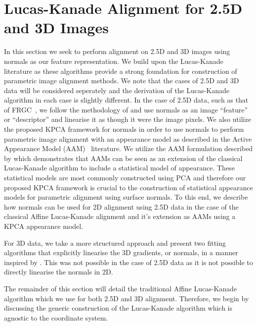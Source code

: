 \section{Lucas-Kanade Alignment for 2.5D and 3D Images}\label{sec:singl_imag_lk}
In this section we seek to perform alignment on 2.5D and 3D images using
normals as our feature representation. We build upon the 
Lucas-Kanade~\cite{lucas1981iterative} literature as these algorithms provide
a strong foundation for construction of parametric image alignment methods. We note that
the cases of 2.5D and 3D data will be considered seperately and the derivation
of the Lucas-Kanade algorithm in each case is slightly different. In the
case of 2.5D data, such as that of FRGC~\cite{phillips2005overview}, we follow
the methodology of \citet{antonakos2015feature} and use normals as an image
``feature'' or ``descriptor'' and linearise it as though it were the image pixels.
We also utilize the proposed KPCA framework for normals in order to use normals
to perform parametric image alignment with an appearance model as described
in the Active Appearance Model (AAM)~\cite{cootes2001active} literature. We
utilize the AAM formulation described by \citet{matthews2004active} which
demonstrates that AAMs can be seen as an extension of the classical Lucas-Kanade
algorithm to include a statistical model of appearance. These statistical models
are most commonly constructed using PCA and therefore our proposed KPCA
framework is crucial to the construction of statistical appearance models for
parametric alignment using surface normals. To this end, we describe how
normals can be used for 2D alignment using 2.5D data in the case of the
classical Affine Lucas-Kanade alignment and it's extension as AAMs using a 
KPCA appearance model.

For 3D data, we take a more structured approach and present two fitting algorithms
that explicitly linearise the 3D gradients, or normals, in a manner inspired
by \citet{tzimiropoulos2011robust}. This was not possible in the case of 2.5D
data as it is not possible to directly linearise the normals in 2D.

The remainder of this section will detail the traditional Affine Lucas-Kanade
algorithm which we use for both 2.5D and 3D alignment. Therefore, we begin by
discussing the generic construction of the Lucas-Kanade algorithm which is
agnostic to the coordinate system.
